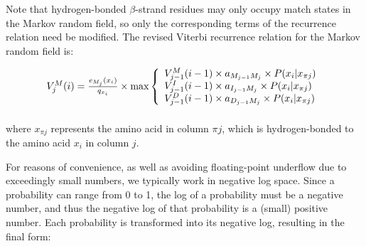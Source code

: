 \documentclass{acm_proc_article-sp}
\begin{document}
Note that hydrogen-bonded $\beta$-strand residues may only occupy match states 
in the Markov random field, so only the corresponding terms of the recurrence
relation need be modified.
The revised Viterbi recurrence relation for the Markov random field is:
\begin{small}
\begin{equation}
\begin{array}{@{}l@{}c@{}l}

V_{j}^{M}(i) &{}={}& \frac{e_{M_{j}}(x_{i})}{q_{x_{i}}} \times \max \left\{
  \begin{array}{l@{}c@{}l}
  V_{j-1}^{M}(i - 1) \times a_{M_{j-1}M_{j}} \times P(x_{i}|x_{\pi j})\\
  V_{j-1}^{I}(i - 1) \times a_{I_{j-1}M_{j}} \times P(x_{i}|x_{\pi j})\\
  V_{j-1}^{D}(i - 1) \times a_{D_{j-1}M_{j}} \times P(x_{i}|x_{\pi j})\\
  \end{array} \right.\\[\goo]

\end{array}
\end{equation}
\end{small}

where $x_{\pi j}$ represents the amino acid in column $\pi j$, which is 
hydrogen-bonded to the amino acid $x_{i}$ in column $j$.

For reasons of convenience, as well as avoiding floating-point underflow due to
exceedingly small numbers, we typically work in negative log space.
Since a probability can range from 0 to 1, the log of a probability must be a
negative number, and thus the negative log of that probability is a (small)
positive number.
Each probability is transformed into its negative log, resulting in the final
form:
\end{document}
